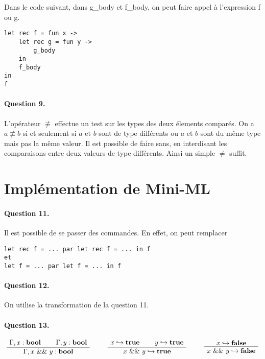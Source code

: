 \documentclass[12pt]{article}
\newenvironment{bprooftree}
  {\leavevmode\hbox\bgroup}
  {\DisplayProof\egroup}
\begin{document}
Dans le code suivant, dans g\_body et f\_body, on peut faire appel à l'expression f ou g.

\begin{verbatim}
let rec f = fun x ->
	let rec g = fun y ->
		g_body
	in
	f_body
in
f
\end{verbatim}


\paragraph{Question 9.}

L'opérateur $\not\equiv$ effectue un test sur les types des deux élements comparés. On a $a \not\equiv b$ si et seulement si $a$ et $b$ sont de type différents ou $a$ et $b$ sont du même type mais pas la même valeur. Il est possible de faire sans, en interdisant les comparaisons entre deux valeurs de type différents. Ainsi un simple $\neq$ suffit.


\section{Implémentation de Mini-ML}


\paragraph{Question 11.}

Il est possible de se passer des commandes. En effet, on peut remplacer
\begin{verbatim}
let rec f = ... par let rec f = ... in f 
et
let f = ... par let f = ... in f
\end{verbatim}


\paragraph{Question 12.}

On utilise la transformation de la question 11.


\paragraph{Question 13.}

\[
\begin{bprooftree}
\AxiomC{$\Gamma, x : \textbf{bool}$}
\AxiomC{$\Gamma, y : \textbf{bool}$}
\BinaryInfC{$\Gamma, x\ \&\& \ y : \textbf{bool}$}
\end{bprooftree} \qquad
\begin{bprooftree}
\AxiomC{$x \hookrightarrow \textbf{true}$}
\AxiomC{$y \hookrightarrow \textbf{true}$}
\BinaryInfC{$x\ \&\& \ y \hookrightarrow \textbf{true}$}
\end{bprooftree} \qquad
\begin{bprooftree}
\AxiomC{$x \hookrightarrow \textbf{false}$}
\UnaryInfC{$x\ \&\& \ y \hookrightarrow \textbf{false}$}
\end{bprooftree}
\]
\end{document}
